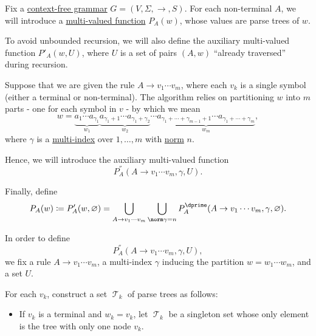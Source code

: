 \begin{algorithm}\label{alg:brute_force_parsing}
  Fix a \hyperref[def:chomsky_hierarchy/context_free]{context-free grammar} \( G = (V, \Sigma, \to, S) \). For each non-terminal \( A \), we will introduce a \hyperref[def:multi_valued_function/total]{multi-valued function} \( P_A(w) \), whose values are parse trees of \( w \).

  To avoid unbounded recursion, we will also define the auxiliary multi-valued function \( P'_A(w, U) \), where \( U \) is a set of pairs \( (A, w) \) \enquote{already traversed} during recursion.

  Suppose that we are given the rule \( A \to v_1 \cdots v_m \), where each \( v_k \) is a single symbol (either a terminal or non-terminal). The algorithm relies on partitioning \( w \) into \( m \) parts - one for each symbol in \( v \) - by which we mean
  \begin{equation*}
    w = \underbrace{ a_1 \cdots a_{\gamma_1} }_{w_1} \underbrace{ a_{\gamma_1 + 1} \cdots a_{\gamma_1 + \gamma_2} }_{w_2} \cdots \underbrace{ a_{\gamma_1 + \cdots + \gamma_{m-1} + 1} \cdots a_{\gamma_1 + \cdots + \gamma_m} }_{w_m},
  \end{equation*}
  where \( \gamma \) is a \hyperref[def:multi_index]{multi-index} over \( 1, \ldots, m \) with \hyperref[def:multi_index]{norm} \( n \).

  Hence, we will introduce the auxiliary multi-valued function
  \begin{equation*}
    P^\dprime_A(A \to v_1 \cdots v_m, \gamma, U).
  \end{equation*}

  Finally, define
  \begin{equation*}
    P_A(w)
    \coloneqq
    P'_A(w, \varnothing)
    =
    \bigcup_{A \to v_1 \cdots v_m} \bigcup_{\norm \gamma = n} P^\dprime_A(A \to v_1 \cdots v_m, \gamma, \varnothing).
  \end{equation*}

  \begin{thmenum}
     In order to define
    \begin{equation*}
      P^\dprime_A(A \to v_1 \cdots v_m, \gamma, U),
    \end{equation*}
    we fix a rule \( A \to v_1 \cdots v_m \), a multi-index \( \gamma \) inducing the partition \( w = w_1 \cdots w_m \), and a set \( U \).

     For each \( v_k \), construct a set \( \mscrT_k \) of parse trees as follows:
    \begin{itemize}
      \item If \( v_k \) is a terminal and \( w_k = v_k \), let \( \mscrT_k \) be a singleton set whose only element is the tree with only one node \( v_k \).


\end{itemize}
\end{thmenum}
\end{algorithm}
